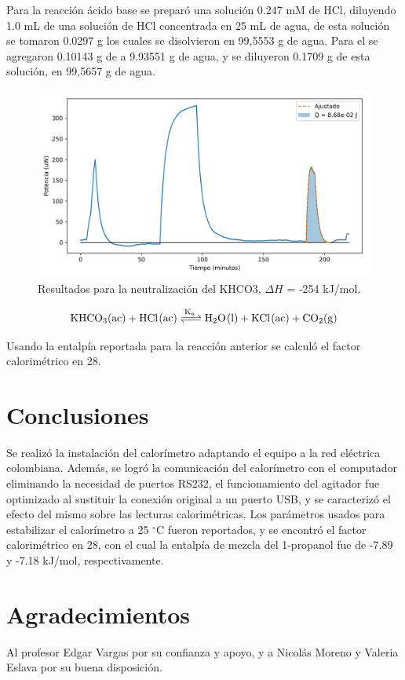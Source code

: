 \documentclass[a0]{sciposter}
\newcommand{\grad}{$^\circ$C}
\newcommand{\figwidth}{0.7\linewidth}
\begin{document}
\begin{multicols}{3}
	Para la reacci\'on \'acido base se prepar\'o una soluci\'on 0.247 mM de HCl, diluyendo 1.0 mL de una soluci\'on de HCl concentrada en 25 mL de agua, de esta soluci\'on se tomaron 0.0297 g los cuales se disolvieron en 99,5553 g de agua. Para el  se agregaron 0.10143 g de  a 9.93551 g de agua, y se diluyeron 0.1709 g de esta soluci\'on, en 99,5657 g de agua.

	\begin{figure}[h]
		\centering
		\includegraphics[width=\figwidth]{../Data/ChemicalCalibrations/HCl}
		\caption{Resultados para la neutralización del {KHCO3}, $\Delta H$ = -254 kJ/mol.}
	\end{figure}

	\begin{equation}
		\ce{KHCO3(ac) + HCl(ac) <=>[K_a] H2O(l) + KCl(ac) + CO2(g)}
	\end{equation}

	Usando la entalp\'ia reportada para la reacci\'on anterior se calcul\'o el factor calorim\'etrico en 28.
	
\section{Conclusiones}
	Se realiz\'o la instalaci\'on del calorímetro adaptando el equipo a la red eléctrica colombiana. Además, se logró la comunicaci\'on del calor\'imetro con el computador eliminando la necesidad de puertos RS232, el funcionamiento del agitador fue optimizado al sustituir la conexión original a un puerto USB, y se caracteriz\'o el efecto del mismo sobre las lecturas calorim\'etricas. Los parámetros usados para estabilizar el calorímetro a 25 \grad{} fueron reportados, y se encontró el factor calorimétrico en 28, con el cual la entalpía de mezcla del 1-propanol fue de -7.89 y -7.18 kJ/mol, respectivamente.

\printbibliography[heading=bibintoc, title={Referencias}]
\section*{Agradecimientos}
	Al profesor Edgar Vargas por su confianza y apoyo, y a Nicol\'as Moreno y Valeria Eslava por su buena disposici\'on.
\end{multicols}
\end{document}
